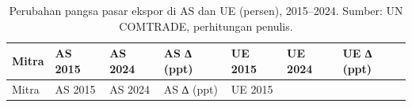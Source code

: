 \documentclass[
  manuscript=article,
  layout=publish,
  year=2026,
  volume=1,
]{den}
\begin{document}
\begin{longtable}[]{@{}
  >{\raggedright\arraybackslash}p{}
  >{\raggedleft\arraybackslash}p{}
  >{\raggedleft\arraybackslash}p{}
  >{\raggedleft\arraybackslash}p{}
  >{\raggedleft\arraybackslash}p{}
  >{\raggedleft\arraybackslash}p{}
  >{\raggedleft\arraybackslash}p{}@{}}
\caption{Perubahan pangsa pasar ekspor di AS dan UE (persen),
2015--2024. Sumber: UN COMTRADE, perhitungan
penulis.}\label{tbl-shares}\tabularnewline
\toprule\noalign{}
\begin{minipage}[b]{\linewidth}\raggedright
Mitra
\end{minipage} & \begin{minipage}[b]{\linewidth}\raggedleft
AS 2015
\end{minipage} & \begin{minipage}[b]{\linewidth}\raggedleft
AS 2024
\end{minipage} & \begin{minipage}[b]{\linewidth}\raggedleft
AS ∆ (ppt)
\end{minipage} & \begin{minipage}[b]{\linewidth}\raggedleft
UE 2015
\end{minipage} & \begin{minipage}[b]{\linewidth}\raggedleft
UE 2024
\end{minipage} & \begin{minipage}[b]{\linewidth}\raggedleft
UE ∆ (ppt)
\end{minipage} \\
\midrule\noalign{}
\endfirsthead
\toprule\noalign{}
\begin{minipage}[b]{\linewidth}\raggedright
Mitra
\end{minipage} & \begin{minipage}[b]{\linewidth}\raggedleft
AS 2015
\end{minipage} & \begin{minipage}[b]{\linewidth}\raggedleft
AS 2024
\end{minipage} & \begin{minipage}[b]{\linewidth}\raggedleft
AS ∆ (ppt)
\end{minipage} & \begin{minipage}[b]{\linewidth}\raggedleft
UE 2015

\end{minipage}
\end{longtable}
\end{document}
